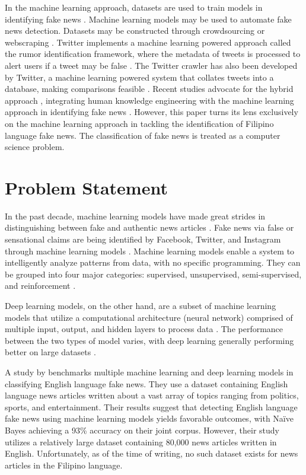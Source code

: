 In the machine learning approach, datasets are used to train models in identifying fake news \cite{debeer2020approaches}. Machine learning models may be used to automate fake news detection. Datasets may be constructed through crowdsourcing \cite{perezrosas2018automatic} or webscraping \cite{cruz2020localization}. Twitter implements a machine learning powered approach called the rumor identification framework, where the metadata of tweets is processed to alert users if a tweet may be false \cite{sivasangari2018modern}. The Twitter crawler has also been developed by Twitter, a machine learning powered system that collates tweets into a database, making comparisons feasible \cite{atodiresei2018identifying}. Recent studies advocate for the hybrid approach \cite{debeer2020approaches}, integrating human knowledge engineering with the machine learning approach in identifying fake news \cite{ruchansky2017csi, okoro2018hybrid}. However, this paper turns its lens exclusively on the machine learning approach in tackling the identification of Filipino language fake news. The classification of fake news is treated as a computer science problem.

\section{Problem Statement}

In the past decade, machine learning models have made
great strides in distinguishing between fake and authentic news articles \cite{ahmed2021detecting}. Fake news via false or sensational claims are being identified by Facebook, Twitter, and Instagram through machine learning models \cite{debeer2020approaches}. Machine learning models enable a system to intelligently analyze patterns from data, with no specific programming. They can be grouped into four major categories: supervised, unsupervised, semi-supervised, and reinforcement \cite{sarker2021machine}.

Deep learning models, on the other hand, are a subset of machine learning models that utilize a computational architecture (neural network) comprised of multiple input, output, and hidden layers to process data \cite{sarker2021machine}. The performance between the two types of model varies, with deep learning generally performing better on large datasets \cite{xin2018machine, sarker2020cybersecurity}.

A study by  benchmarks multiple machine learning and deep learning models in classifying English language fake news. They use a dataset containing English language news articles written about a vast array of topics ranging from politics, sports, and entertainment. Their results suggest that detecting English language fake news using machine learning models yields favorable outcomes, with Naïve Bayes achieving a 93\% accuracy on their joint corpus. However, their study utilizes a relatively large dataset containing 80,000 news articles written in English. Unfortunately, as of the time of writing, no such dataset exists for news articles in the Filipino language.

